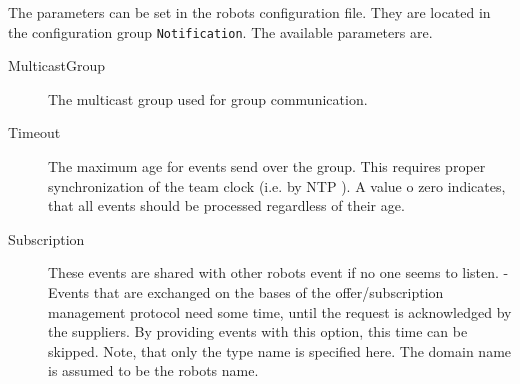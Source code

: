 The parameters can be set in the robots configuration file. They are
located in the configuration group \texttt{Notification}. The
available parameters are.
\begin{description}
\item[MulticastGroup] The multicast group used for group communication.
\item[Timeout] The maximum age for events send over the group. This
  requires proper synchronization of the team clock (i.e. by NTP
  \cite{RFC2030}). A value o zero indicates, that all events should be
  processed regardless of their age.
\item[Subscription] These events are shared with other robots event if
  no one seems to listen. - Events that are exchanged on the bases of the
  offer/subscription management protocol need some time, until the
  request is acknowledged by the suppliers. By providing events with
  this option, this time can be skipped. Note, that only the type name
  is specified here. The domain name is assumed to be the robots name.
\end{description}


